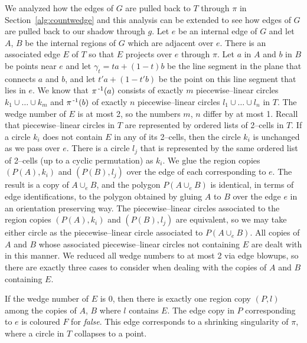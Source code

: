 We analyzed how the edges of $G$ are pulled back to $T$ through $\pi$ in Section~\ref{alg:countwedge} and this analysis can be extended to see how edges of $G$ are pulled back to our shadow through $g$.
Let $e$ be an internal edge of $G$ and let $A$, $B$ be the internal regions of $G$ which are adjacent over $e$.
There is an associated edge $E$ of $T$ so that $E$ projects over $e$ through $\pi$.
Let $a$ in $A$ and $b$ in $B$ be points near $e$ and let $\gamma_t = ta + (1-t)b$ be the line segment in the plane that connects $a$ and $b$, and let $t'a+(1-t'b)$ be the point on this line segment that lies in $e$.
We know that $\pi^{\,\text{-}1}(a)$ consists of exactly $m$ piecewise--linear circles $k_1\cup\dots\cup k_m$ and $\pi^{\,\text{-}1}(b)$ of exactly $n$ piecewise--linear circles $l_1\cup\dots\cup l_n$ in $T$.
The wedge number of $E$ is at most 2, so the numbers $m$, $n$ differ by at most 1.
Recall that piecewise--linear circles in $T$ are represented by ordered lists of 2--cells in $T$.
If a circle $k_i$ does not contain $E$ in any of its 2--cells, then the circle $k_i$ is unchanged as we pass over $e$.
There is a circle $l_j$ that is represented by the same ordered list of 2--cells (up to a cyclic permutation) as $k_i$.
We glue the region copies $(P(A),k_i)$ and $(P(B),l_j)$ over the edge of each corresponding to $e$.
The result is a copy of $A\cup_e B$, and the polygon $P(A\cup_e B)$ is identical, in terms of edge identifications, to the polygon obtained by gluing $A$ to $B$ over the edge $e$ in an orientation preserving way.
The piecewise--linear circles associated to the region copies $(P(A),k_i)$ and $(P(B),l_j)$ are equivalent, so we may take either circle as the piecewise--linear circle associated to $P(A\cup_e B)$.
All copies of $A$ and $B$ whose associated piecewise--linear circles not containing $E$ are dealt with in this manner.
We reduced all wedge numbers to at most 2 via edge blowups, so there are exactly three cases to consider when dealing with the copies of $A$ and $B$ containing $E$.

If the wedge number of $E$ is 0, then there is exactly one region copy $(P,l)$ among the copies of $A$, $B$ where $l$ contains $E$.
The edge copy in $P$ corresponding to $e$ is coloured $F$ for \emph{false}.
This edge corresponds to a shrinking singularity of $\pi$, where a circle in $T$ collapses to a point.

